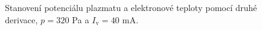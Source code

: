 \documentclass[a4paper,12pt]{article}
\begin{document}
\begin{figure}[h]
	\centering
	\begin{subfigure}[b]{.49\textwidth}
		\centering
	\end{subfigure}
	\begin{subfigure}[b]{.49\textwidth}
		\centering
	\end{subfigure}
	\caption{Stanovení potenciálu plazmatu a elektronové teploty pomocí druhé 
	derivace, $p = 320$ 
	\si{\pascal} a $I_\text{v} = 40$ \si{\milli\ampere}.}
	\label{data3sec}
\end{figure}
\end{document}
